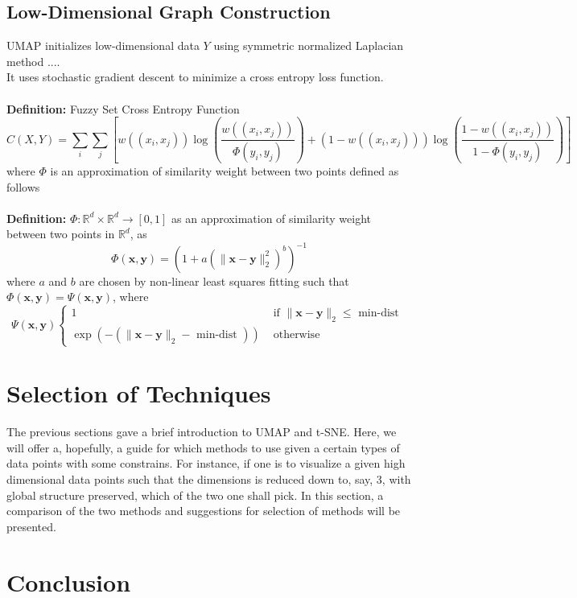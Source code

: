 \documentclass[runningheads]{llncs}
\begin{document}
	\subsection{ Low-Dimensional Graph Construction }
	UMAP initializes low-dimensional data $Y$ using symmetric normalized Laplacian method ....\\ It uses stochastic gradient descent to minimize a cross entropy loss function.\\
	\\
	\textbf{Definition:} Fuzzy Set Cross Entropy Function
	$$C(X, Y)=\sum_{i} \sum_{j}\left[w((x_i, x_j)) \log \left(\frac{w((x_i, x_j))}{\Phi(y_i, y_j)}\right)+\left(1-w((x_i, x_j))\right) \log \left(\frac{1-w((x_i, x_j))}{1-\Phi(y_i, y_j)}\right)\right]$$
	where $\Phi$ is an approximation of similarity weight between two points defined as follows
	\\
	\\
	\textbf{Definition:} \(\Phi: \mathbb{R}^{d} \times \mathbb{R}^{d} \rightarrow[0,1]\) as an approximation of similarity weight between two points in $\mathbb{R}^{d}$, as $$\Phi(\mathbf{x}, \mathbf{y})=\left(1+a\left(\|\mathbf{x}-\mathbf{y}\|_{2}^{2}\right)^{b}\right)^{-1}$$
where $a$ and $b$ are chosen by non-linear least squares fitting such that $\Phi(\mathbf{x}, \mathbf{y})= \Psi(\mathbf{x}, \mathbf{y})$, where
$$ \Psi(\mathbf{x}, \mathbf{y})\left\{\begin{array}{ll}1 & \text { if }\|\mathbf{x}-\mathbf{y}\|_{2} \leq \text { min-dist } \\ \exp \left(-\left(\|\mathbf{x}-\mathbf{y}\|_{2}-\text { min-dist }\right)\right) & \text { otherwise }\end{array}\right.$$
	
\section{Selection of Techniques}
The previous sections gave a brief introduction to UMAP and t-SNE. Here, we will offer a, hopefully, a guide for which methods to use given a certain types of data points with some constrains. For instance, if one is to visualize a given high dimensional data points such that the dimensions is reduced down to, say, 3, with global structure preserved, which of the two one shall pick. In this section, a comparison of the two methods and suggestions for selection of methods will be presented.  



\section{Conclusion}


%
%
%


%
\end{document}

